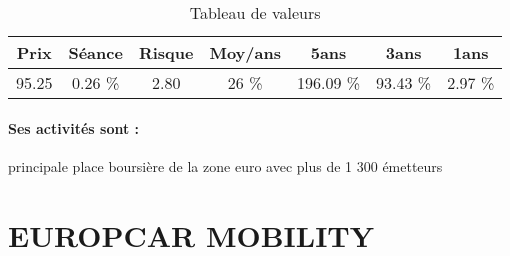 \documentclass[11pt,a4paper]{report}%
\begin{document}
\begin{table}[H]
  \centering
    \begin{tabular}{|c|c|c|c|c|c|c|}
    \hline
    Prix & Séance & Risque  & Moy/ans & 5ans & 3ans & 1ans \\
    \hline
    95.25 &    0.26 \%    & 2.80 & 26 \% & 196.09 \% & 93.43 \% & 2.97 \% \\
    \hline
    \end{tabular}%
        \label{tab:table_EURONEXT}%
      \caption{Tableau de valeurs}
\end{table}%

\paragraph{Ses activités sont : } principale place boursière de la zone euro avec plus de 1 300 émetteurs 
    
    \newpage

\section{EUROPCAR MOBILITY}
\end{document}
